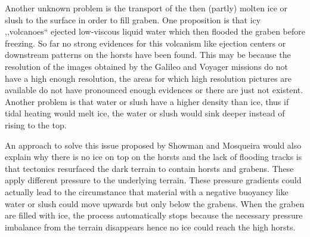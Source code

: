 Another unknown problem is the transport of the then (partly) molten
ice or slush to the surface in order to fill graben. One proposition
is that icy ,,volcanoes`` ejected low-viscous liquid water which
then flooded the graben before freezing. So far no strong evidences
for this volcanism like ejection centers or downstream patterns on
the horsts have been found\cite{Patterson2010}. This may be because
the resolution of the images obtained by the Galileo and Voyager missions
do not have a high enough resolution, the areas for which high resolution
pictures are available do not have pronounced enough evidences or
there are just not existent\cite{Patterson2010,Schenk2001,Showman2004}.
Another problem is that water or slush have a higher density than
ice, thus if tidal heating would melt ice, the water or slush would
sink deeper instead of rising to the top.

An approach to solve this issue proposed by Showman and Mosqueira
would also explain why there is no ice on top on the horsts and the
lack of flooding tracks is that tectonics resurfaced the dark terrain
to contain horsts and grabens. These apply different pressure to the
underlying terrain. These pressure gradients could actually lead to
the circumstance that material with a negative buoyancy like water
or slush could move upwards but only below the grabens. When the graben
are filled with ice, the process automatically stops because the necessary
pressure imbalance from the terrain disappears hence no ice could
reach the high horsts\cite{Showman2004}. 

